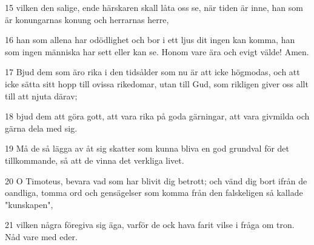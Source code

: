 \par 15 vilken den salige, ende härskaren skall låta oss se, när tiden är inne, han som är konungarnas konung och herrarnas herre,
\par 16 han som allena har odödlighet och bor i ett ljus dit ingen kan komma, han som ingen människa har sett eller kan se. Honom vare ära och evigt välde! Amen.
\par 17 Bjud dem som äro rika i den tidsålder som nu är att icke högmodas, och att icke sätta sitt hopp till ovissa rikedomar, utan till Gud, som rikligen giver oss allt till att njuta därav;
\par 18 bjud dem att göra gott, att vara rika på goda gärningar, att vara givmilda och gärna dela med sig.
\par 19 Må de så lägga av åt sig skatter som kunna bliva en god grundval för det tillkommande, så att de vinna det verkliga livet.
\par 20 O Timoteus, bevara vad som har blivit dig betrott; och vänd dig bort ifrån de oandliga, tomma ord och gensägelser som komma från den falskeligen så kallade "kunskapen",
\par 21 vilken några föregiva sig äga, varför de ock hava farit vilse i fråga om tron. Nåd vare med eder.


